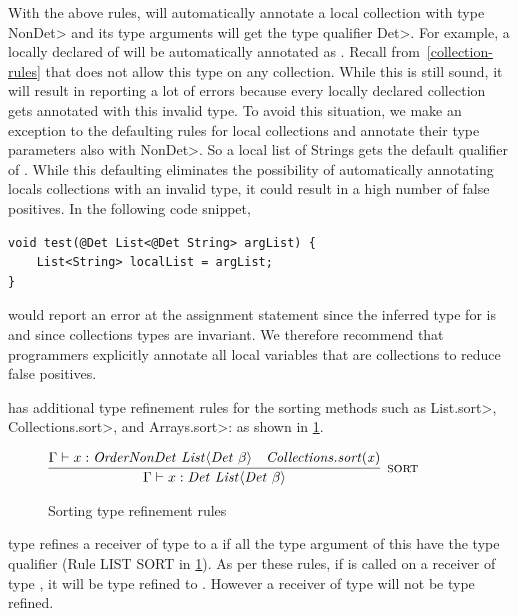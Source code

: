 With the above rules, \theDeterminismChecker will automatically annotate a local collection with type \<NonDet> and its
type arguments will get the type qualifier \<Det>. For example, a locally declared  of  will be automatically annotated
as . Recall from~\cref{collection-rules} that \theDeterminismChecker does not allow this type on
any collection. While this is still sound, it will result in \theDeterminismChecker reporting a lot of errors because every locally declared 
collection gets annotated with this invalid type. To avoid this situation, we make an exception to the defaulting rules for local collections
and annotate their type parameters also with \<NonDet>. So a local list of Strings gets the default qualifier of . While this defaulting eliminates the possibility of automatically annotating locals collections with an invalid
type, it could result in a high number of false positives. In the following code snippet,
\begin{verbatim}
void test(@Det List<@Det String> argList) {
    List<String> localList = argList;
}    
\end{verbatim}
\theDeterminismChecker would report an error at the assignment statement since the inferred type for  is 
 and since collections types are invariant.
We therefore recommend that programmers explicitly annotate
all local variables that are collections to reduce false positives.

\TheDeterminismChecker has additional type refinement rules for the sorting
methods such as \<List.sort>, \<Collections.sort>, and \<Arrays.sort>:
 as shown in \cref{fig-sorting}.
\begin{figure}
%     
    
    $\infer[\rulename{sort}]{\Gamma \vdash x : \|Det \ List|\angles{\|Det| \ \beta}}{\Gamma \vdash x : \|OrderNonDet \ List|\angles{\|Det| \ \beta} & \|Collections.sort(x)|}$
    
%     
    
    \caption{Sorting type refinement rules}
    \label{fig-sorting}
\end{figure}
\TheDeterminismChecker type refines a receiver of type  to a  if all the
type argument of this  have the type qualifier  (Rule LIST SORT in \cref{fig-sorting}).
As per these rules, if  is called on a receiver of type , it will
be type refined to . However a receiver of type  will not be type refined.

